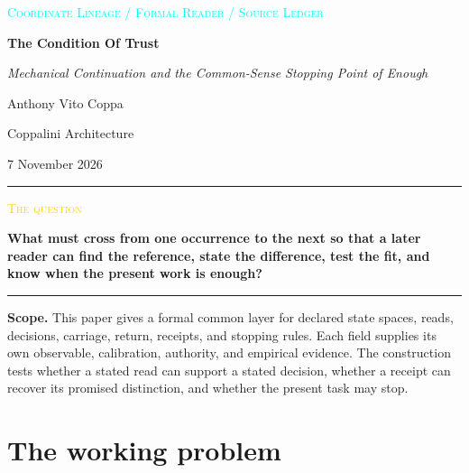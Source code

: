 \documentclass[11pt]{article}
\newcommand{\smallcaps}[1]{{\footnotesize\textsc{#1}}}
\begin{document}
\begin{titlepage}
\thispagestyle{empty}
\vspace*{0.8cm}
\begin{center}
  {\large\textcolor{cyan}{\textsc{Coordinate Lineage / Formal Reader / Source Ledger}}\par}
  \vspace{1.55cm}
  {\fontsize{38}{43}\selectfont\bfseries\color{deep}The Condition Of Trust\par}
  \vspace{0.45cm}
  {\Large\itshape Mechanical Continuation and the Common-Sense Stopping Point of Enough\par}
  \vspace{1.2cm}
  {\large Anthony Vito Coppa\par}
  {\normalsize Coppalini Architecture\par}
  \vspace{0.5cm}
  {\small 7 November 2026\par}
\end{center}
\vfill
\noindent\rule{\linewidth}{0.55pt}\par\vspace{0.75em}
\begin{minipage}{0.93\linewidth}
\textcolor{gold}{\smallcaps{The question}}\par
\large\textbf{What must cross from one occurrence to the next so that a later reader can find the reference, state the difference, test the fit, and know when the present work is enough?}
\end{minipage}
\vspace{0.75em}\par\noindent\rule{\linewidth}{0.55pt}
\vfill
\begin{minipage}{0.93\linewidth}
\small
\textbf{Scope.} This paper gives a formal common layer for declared state spaces, reads, decisions, carriage, return, receipts, and stopping rules. Each field supplies its own observable, calibration, authority, and empirical evidence. The construction tests whether a stated read can support a stated decision, whether a receipt can recover its promised distinction, and whether the present task may stop.
\end{minipage}
\end{titlepage}
\clearpage
{}

\section*{The working problem}
\end{document}
